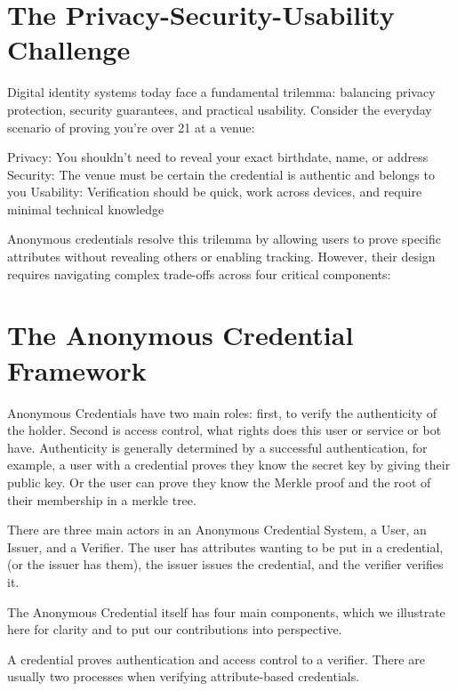 \section{The Privacy-Security-Usability Challenge}
Digital identity systems today face a fundamental trilemma: balancing privacy protection, security guarantees, and practical usability. Consider the everyday scenario of proving you're over 21 at a venue:

Privacy: You shouldn't need to reveal your exact birthdate, name, or address
Security: The venue must be certain the credential is authentic and belongs to you
Usability: Verification should be quick, work across devices, and require minimal technical knowledge

Anonymous credentials resolve this trilemma by allowing users to prove specific attributes without revealing others or enabling tracking. However, their design requires navigating complex trade-offs across four critical components:

\section{The Anonymous Credential Framework}
Anonymous Credentials have two main roles: first, to verify the authenticity of the holder. Second is access control, what rights does this user or service or bot have. Authenticity is generally determined by a successful authentication, for example, a user with a credential proves they know the secret key by giving their public key. Or the user can prove they know the Merkle proof and the root of their membership in a merkle tree. 

There are three main actors in an Anonymous Credential System, a User, an Issuer, and a Verifier. 
The user has attributes wanting to be put in a credential, (or the issuer has them), the issuer issues the credential, and the verifier verifies it. 

The Anonymous Credential itself has four main components, which we illustrate here for clarity and to put our contributions into perspective. 

A credential proves authentication and access control to a verifier. 
There are usually two processes when verifying attribute-based credentials. 

